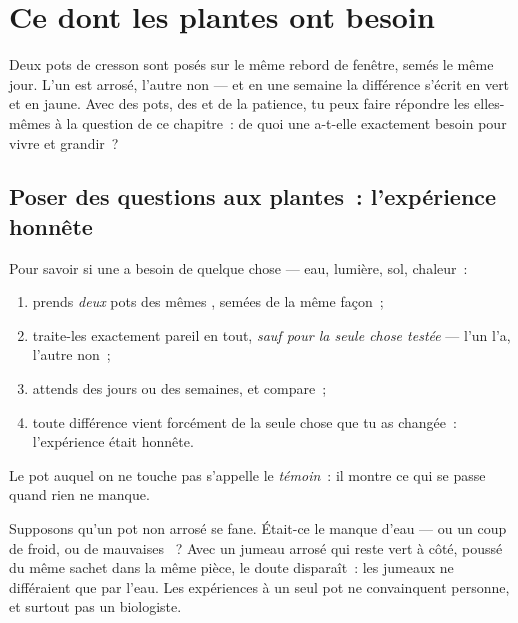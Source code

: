 \chapter{Ce dont les plantes ont besoin}\label{ch:g4:what-plants-need}

Deux pots de cresson sont posés sur le même rebord de fenêtre, semés
le même jour. L'un est arrosé, l'autre non --- et en une semaine la
différence s'écrit en vert et en jaune. Avec des pots, des 
et de la patience, tu peux faire répondre les  elles-mêmes à
la question de ce chapitre~: de quoi une  a-t-elle exactement
besoin pour vivre et grandir~?

\section{Poser des questions aux plantes~: l'expérience honnête}

\begin{method}\label{met:g4:what-plants-need:fairtest}
Pour savoir si une  a besoin de quelque chose --- eau,
lumière, sol, chaleur~:
\begin{enumerate}
  \item prends \emph{deux} pots des mêmes , semées de la
        même façon~;
  \item traite-les exactement pareil en tout, \emph{sauf pour la
        seule chose testée} --- l'un l'a, l'autre non~;
  \item attends des jours ou des semaines, et compare~;
  \item toute différence vient forcément de la seule chose que tu
        as changée~: l'expérience était honnête.
\end{enumerate}
Le pot auquel on ne touche pas s'appelle le
\emph{témoin}~: il montre ce qui se passe
quand rien ne manque.
\end{method}

\begin{example}\label{ex:g4:what-plants-need:control}
Supposons qu'un pot non arrosé se fane. Était-ce le manque d'eau ---
ou un coup de froid, ou de mauvaises ~? Avec un jumeau arrosé
qui reste vert à côté, poussé du même sachet dans la même pièce, le
doute disparaît~: les jumeaux ne différaient que par l'eau. Les
expériences à un seul pot ne convainquent personne, et surtout pas
un biologiste.
\end{example}



